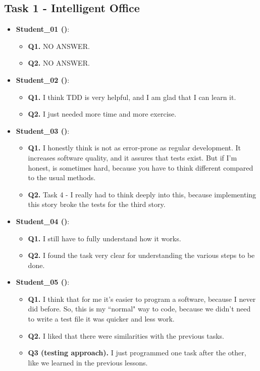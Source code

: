 \subsection{Task 1 - Intelligent Office}
\begin{itemize}
    \item \textbf{Student\_01 (\tdd)}: 
    \begin{itemize}
        \item \textbf{Q1.} NO ANSWER.
        \item \textbf{Q2.} NO ANSWER.
    \end{itemize}

    \item \textbf{Student\_02 (\tdd)}: 
    \begin{itemize}
        \item \textbf{Q1.} I think TDD is very helpful, and I am glad that I can learn it.
        \item \textbf{Q2.} I just needed more time and more exercise.
    \end{itemize}

    \item \textbf{Student\_03 (\tdd)}: 
    \begin{itemize}
        \item \textbf{Q1.} I honestly think \tdd is not as error-prone as regular development. It increases software quality, and it assures that tests exist. But if I'm honest, \tdd is sometimes hard, because you have to think different compared to the usual methods.
        \item \textbf{Q2.} Task 4 - I really had to think deeply into this, because implementing this story broke the tests for the third story.
    \end{itemize}

    \item \textbf{Student\_04 (\tdd)}: 
    \begin{itemize}
        \item \textbf{Q1.} I still have to fully understand how it works.
        \item \textbf{Q2.} I found the task very clear for understanding the various steps to be done.
    \end{itemize}

    \item \textbf{Student\_05 (\notdd)}: 
    \begin{itemize}
        \item \textbf{Q1.} I think that for me it's easier to program a \notdd software, because I never did \tdd before. So, this is my ``normal" way to code, because we didn't need to write a test file it was quicker and less work.
        \item \textbf{Q2.} I liked that there were similarities with the previous tasks.
        \item \textbf{Q3 (\notdd testing approach).} I just programmed one task after the other, like we learned in the previous lessons. 
    \end{itemize}


\end{itemize}
